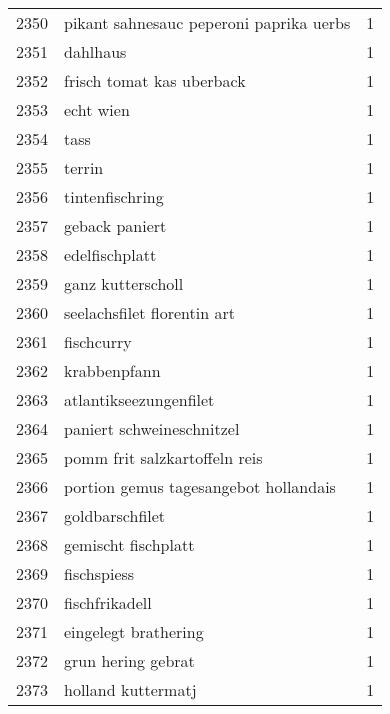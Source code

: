 \begin{tabular}{llr}
2350 &            pikant sahnesauc peperoni paprika uerbs &      1 \\
2351 &                                           dahlhaus &      1 \\
2352 &                          frisch tomat kas uberback &      1 \\
2353 &                                          echt wien &      1 \\
2354 &                                               tass &      1 \\
2355 &                                             terrin &      1 \\
2356 &                                    tintenfischring &      1 \\
2357 &                                     geback paniert &      1 \\
2358 &                                     edelfischplatt &      1 \\
2359 &                                  ganz kutterscholl &      1 \\
2360 &                        seelachsfilet florentin art &      1 \\
2361 &                                         fischcurry &      1 \\
2362 &                                       krabbenpfann &      1 \\
2363 &                             atlantikseezungenfilet &      1 \\
2364 &                          paniert schweineschnitzel &      1 \\
2365 &                      pomm frit salzkartoffeln reis &      1 \\
2366 &              portion gemus tagesangebot hollandais &      1 \\
2367 &                                    goldbarschfilet &      1 \\
2368 &                                gemischt fischplatt &      1 \\
2369 &                                        fischspiess &      1 \\
2370 &                                     fischfrikadell &      1 \\
2371 &                               eingelegt brathering &      1 \\
2372 &                                 grun hering gebrat &      1 \\
2373 &                                 holland kuttermatj &      1 \\

\end{tabular}

